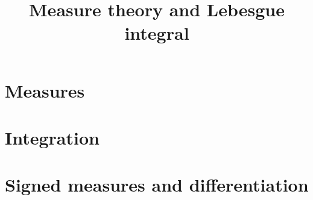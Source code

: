 
    \usepackage{xcolor}





\title{Measure theory and Lebesgue integral}
\author{}



\maketitle

\tableofcontents

\chapter{Measures}
    
    
    
    
    
    
    
    

\chapter{Integration}
    
    
    
    
    
    
    

\chapter{Signed measures and differentiation}
    
    
    

